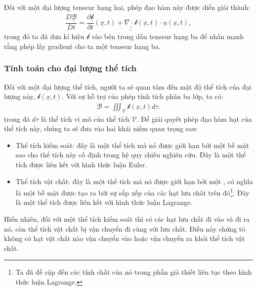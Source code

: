 \documentclass[../../../main.tex]{subfiles}
\begin{document}
		Đối với một đại lượng tenseur hạng hai, phép đạo hàm này được diển giải thành:
			\begin{align}
				\boxed{\dfrac{D\underline{\underline{\mathscr{B}}}}{Dt}=\dfrac{\partial\underline{\underline{\mathscr{b}}}}{\partial t}\left(\underline{x},t\right)+\underline{\underline{\underline{\nabla\cdot\mathscr{b}}}}\left(\underline{x},t\right)\cdot\underline{u}\left(\underline{x},t\right)},
			\end{align}
		trong đó ta đã đưa kí hiệu $\mathscr{b}$ vào bên trong dấu tenseur  hạng ba để nhấn mạnh rằng phép lấy gradient cho ta một tenseur hạng ba.
	\subsubsection{Tính toán cho đại lượng thể tích}
		Đối với một đại lượng thể tích, người ta sẽ quan tâm đến mật độ thể tích của đại lượng này, $\mathcal{b}\left(\underline{x},t\right)$. Với sự hỗ trợ của phép tính tích phân ba lớp, ta có:
			\begin{align}\label{eq:Quantite_Volumique_def}
				\mathscr{B}=\iiint_{\mathscr{V}}\mathcal{b}\left(\underline{x},t\right)d\tau.
			\end{align}
		trong đó $d\tau$ là thể tích vi mô của thể tích $\mathscr{V}$. Để giải quyết phép đạo hàm hạt của thể tích này, chúng ta sẽ đưa vào hai khái niệm quan trọng sau:
		\begin{itemize}
			\item Thể tích kiểm soát: đây là một thể tích mà nó được giới hạn bởi một bề mặt sao cho thể tích này cố định trong hệ quy chiếu nghiên cứu. Đây là một thể tích được liên kết với hình thức luận Euler.
			\item Thể tích vật chất: đây là một thể tích mà nó được giới hạn bởi một , có nghĩa là một bề mặt được tạo ra bởi sự sắp xếp của các hạt lưu chất trên đó\footnote{Ta đã đề cập đến các tính chất của nó trong phần giả thiết liên tục theo hình thức luận Lagrange.}. Đây là một thể tích được liên kết với hình thức luận Lagrange.
		\end{itemize}

		Hiển nhiên, đối với một thể tích kiểm soát thì có các hạt lưu chất đi vào và đi ra nó, còn thể tích vật chất bị vận chuyển đi cùng với lưu chất. Điều này chứng tỏ không có hạt vật chất nào vận chuyển vào hoặc vận chuyển ra khỏi thể tích vật chất.
		
\end{document}
